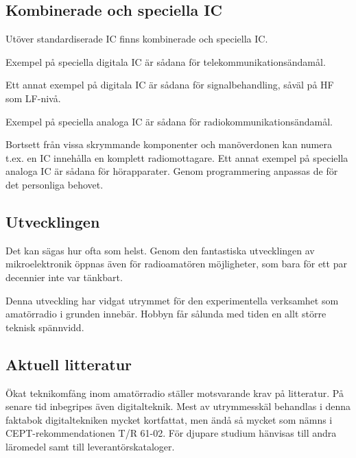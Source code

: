 \subsection{Kombinerade och speciella IC}

Utöver standardiserade IC finns kombinerade och speciella IC.

Exempel på speciella digitala IC är sådana för telekommunikationsändamål.

Ett annat exempel på digitala IC är sådana för signalbehandling, såväl på HF som
LF-nivå.

Exempel på speciella analoga IC är sådana för radiokommunikationsändamål.

Bortsett från vissa skrymmande komponenter och manöverdonen kan numera t.ex. en
IC innehålla en komplett radiomottagare. Ett annat exempel på speciella analoga
IC är sådana för hörapparater. Genom programmering anpassas de för det
personliga behovet.

\subsection{Utvecklingen}

Det kan sägas hur ofta som helst. Genom den fantastiska utvecklingen av
mikroelektronik öppnas även för radioamatören möjligheter, som bara för ett par
decennier inte var tänkbart.

Denna utveckling har vidgat utrymmet för den experimentella verksamhet som
amatörradio i grunden innebär. Hobbyn får sålunda med tiden en allt större
teknisk spännvidd.

\subsection{Aktuell litteratur}

Ökat teknikomfång inom amatörradio ställer motsvarande krav på litteratur. På
senare tid inbegripes även digitalteknik. Mest av utrymmesskäl behandlas i denna
faktabok digitaltekniken mycket kortfattat, men ändå så mycket som nämns i
CEPT-rekommendationen T/R 61-02. För djupare studium hänvisas till andra
läromedel samt till leverantörskataloger.
